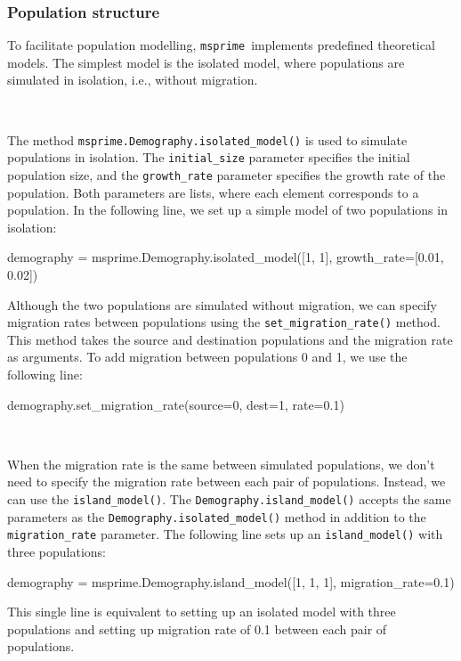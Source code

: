 \documentclass[graybox]{svmult}
\newcommand{\msprime}[0]{\texttt{msprime}}
\begin{document}
\subsubsection{Population structure}\label{population-structure}
To facilitate population modelling, \msprime\ implements
predefined theoretical models. The simplest model is the isolated model,
where populations are simulated in isolation, i.e., without migration.

\label{isolated-model} \

The method \texttt{msprime.Demography.isolated\_model()} is used to
simulate populations in isolation. The \texttt{initial\_size} parameter
specifies the initial population size, and the \texttt{growth\_rate}
parameter specifies the growth rate of the population. Both parameters
are lists, where each element corresponds to a population. In the
following line, we set up a simple model of two populations in isolation:
\begin{pythoncode}
    demography =  msprime.Demography.isolated_model([1, 1],
                                        growth_rate=[0.01, 0.02])
\end{pythoncode}
Although the two populations are simulated without migration, we can
specify migration rates between populations using the \texttt{set\_migration\_rate()}
method. This method takes the source and destination populations and the migration rate as arguments.
To add migration between populations 0 and 1, we use the following line:
\begin{pythoncode}
    demography.set_migration_rate(source=0, dest=1, rate=0.1)
\end{pythoncode}

\label{island-model} \

When the migration rate is the same between simulated populations, we don't
need to specify the migration rate between each pair of populations. Instead,
we can use the \texttt{island\_model()}. The \texttt{Demography.island\_model()} accepts
the same parameters as the \texttt{Demography.isolated\_model()} method in
addition to the \texttt{migration\_rate} parameter. The following line sets up an
\texttt{island\_model()} with three populations:
\begin{pythoncode}
    demography =  msprime.Demography.island_model([1, 1, 1],
                                             migration_rate=0.1)
\end{pythoncode}

This single line is equivalent to setting up an isolated model with three populations
and setting up migration rate of 0.1 between each pair of populations.
\end{document}
